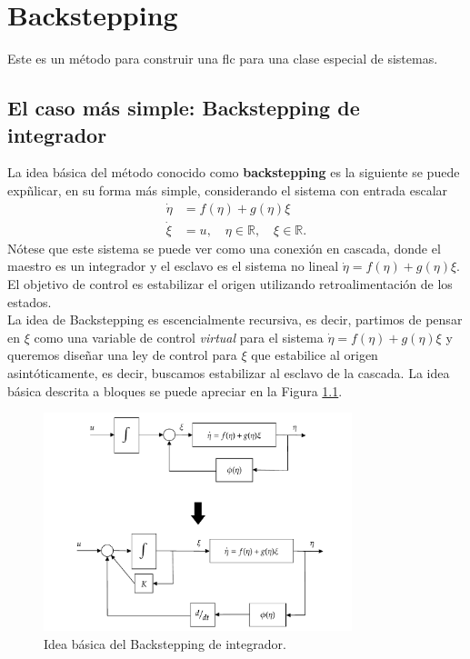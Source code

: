 \chapter{Backstepping}
Este es un método para construir una \gls{flc} para una clase especial de sistemas.\\

\section{El caso más simple: Backstepping de integrador}
La idea básica del método conocido como \textbf{backstepping} es la siguiente se puede expñlicar, en su forma más simple, considerando el sistema con entrada escalar
\begin{equation}
	\begin{aligned}
		\dot{\eta} & = f(\eta) + g(\eta)\xi                                    \\
		\dot{\xi}  & = u, \quad \eta \in \mathbb{R}, \quad \xi \in \mathbb{R}.
	\end{aligned}
	\label{eq: backstepping_integrador}
\end{equation}
Nótese que este sistema se puede ver como una conexión en cascada, donde el maestro es un integrador y el esclavo es el sistema no lineal $\dot{\eta} = f(\eta) + g(\eta)\xi$. El objetivo de control es estabilizar el origen utilizando retroalimentación de los estados.\\

La idea de Backstepping es escencialmente recursiva, es decir, partimos de pensar en $\xi$ como una variable de control \textit{virtual} para el sistema $\dot{\eta} = f(\eta) + g(\eta)\xi$ y queremos diseñar una ley de control para $\xi$ que estabilice al origen asintóticamente, es decir, buscamos estabilizar al esclavo de la cascada. La idea básica descrita a bloques se puede apreciar en la Figura \ref{fig: backstepping_bloques}.\\

\begin{figure}[H]
	\centering
	\includegraphics[width=0.8\textwidth]{img/backstepping_BlockDiagram.pdf}
	\caption{Idea básica del Backstepping de integrador.}
	\label{fig: backstepping_bloques}
\end{figure}

